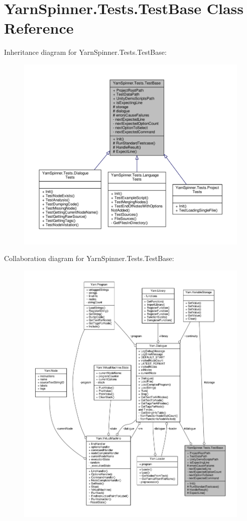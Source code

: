 \hypertarget{a00154}{\section{Yarn\-Spinner.\-Tests.\-Test\-Base Class Reference}
\label{a00154}
}


Inheritance diagram for Yarn\-Spinner.\-Tests.\-Test\-Base\-:
\nopagebreak
\begin{figure}[H]
\begin{center}
\leavevmode
\includegraphics[width=350pt]{a00734}
\end{center}
\end{figure}


Collaboration diagram for Yarn\-Spinner.\-Tests.\-Test\-Base\-:
\nopagebreak
\begin{figure}[H]
\begin{center}
\leavevmode
\includegraphics[width=350pt]{a00735}
\end{center}
\end{figure}
